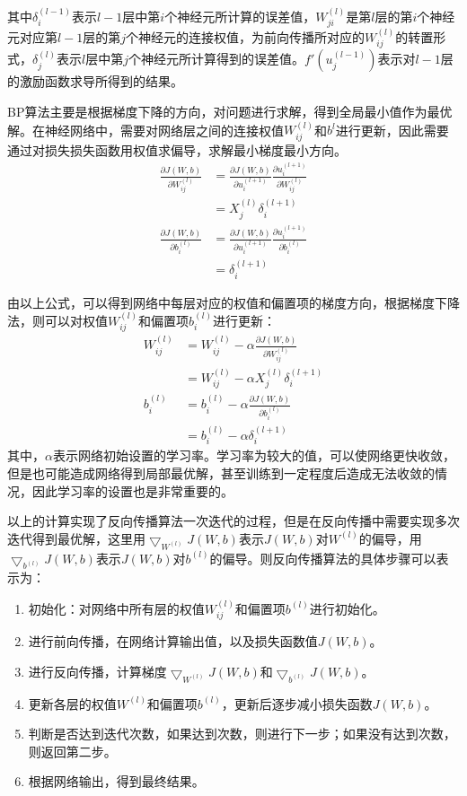 其中$\delta_{i}^{(l-1)}$表示$l-1$层中第$i$个神经元所计算的误差值，$W_{ji}^{(l)}$是第$l$层的第$i$个神经元对应第$l-1$层的第$j$个神经元的连接权值，为前向传播所对应的$W_{ij}^{(l)}$的转置形式，$\delta_{j}^{(l)}$表示$l$层中第$j$个神经元所计算得到的误差值。$f'(u_{j}^{(l-1)})$表示对$l-1$层的激励函数求导所得到的结果。

BP算法主要是根据梯度下降的方向，对问题进行求解，得到全局最小值作为最优解。在神经网络中，需要对网络层之间的连接权值$W_{ij}^{(l)}$和$b^{l}$进行更新，因此需要通过对损失损失函数用权值求偏导，求解最小梯度最小方向。
\begin{align}
\frac{\partial J(W,b)}{\partial W_{ij}^{(l)}} & = {\frac{\partial J(W,b)}{\partial u_{i}^{(l+1)}}} {\frac{\partial u_{i}^{(l+1)}}{\partial W_{ij}^{(l)}}}  \\
					    & =  X_{j}^{(l)} \delta_{i}^{(l+1)} \\
\frac{\partial J(W,b)}{\partial b_{i}^{(l)}} & = \frac{\partial J(W,b)}{\partial u_{i}^{(l+1)}} {\frac{\partial u_{i}^{(l+1)}}{\partial b_{i}^{(l)}}} \\
					    & = \delta_{i}^{(l+1)}
\end{align}

由以上公式，可以得到网络中每层对应的权值和偏置项的梯度方向，根据梯度下降法，则可以对权值$W_{ij}^{(l)}$和偏置项$b_{i}^{(l)}$进行更新：
\begin{align}
W_{ij}^{(l)} & = W_{ij}^{(l)} - \alpha \frac{\partial J(W,b)}{\partial W_{ij}^{(l)}}  \\
	     & = W_{ij}^{(l)} - \alpha X_{j}^{(l)} \delta_{i}^{(l+1)} \\
b_{i}^{(l)} & = b_{i}^{(l)} - \alpha \frac{\partial J(W,b)}{\partial b_{i}^{(l)}} \\
	    & = b_{i}^{(l)} - \alpha \delta_{i}^{(l+1)}
\end{align}
其中，$\alpha$表示网络初始设置的学习率。学习率为较大的值，可以使网络更快收敛，但是也可能造成网络得到局部最优解，甚至训练到一定程度后造成无法收敛的情况，因此学习率的设置也是非常重要的。

以上的计算实现了反向传播算法一次迭代的过程，但是在反向传播中需要实现多次迭代得到最优解，这里用$\bigtriangledown_{W^(l)} J(W,b)$表示$J(W,b)$对$W^{(l)}$的偏导，用$\bigtriangledown_{b^(l)} J(W,b)$表示$J(W,b)$对$b^{(l)}$的偏导。则反向传播算法的具体步骤可以表示为：
\begin{enumerate}
\item 初始化：对网络中所有层的权值$W_{ij}^{(l)}$和偏置项$b^(l)$进行初始化。
\item 进行前向传播，在网络计算输出值，以及损失函数值$J(W,b)$。
\item 进行反向传播，计算梯度$\bigtriangledown_{W^(l)} J(W,b)$和$\bigtriangledown_{b^(l)} J(W,b)$。
\item 更新各层的权值$W^{(l)}$和偏置项$b^{(l)}$，更新后逐步减小损失函数$J(W,b)$。
\item 判断是否达到迭代次数，如果达到次数，则进行下一步；如果没有达到次数，则返回第二步。
\item 根据网络输出，得到最终结果。
\end{enumerate}


